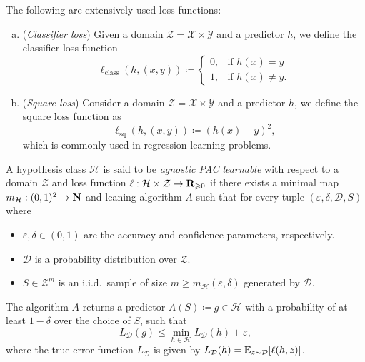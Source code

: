 \begin{example}
    \label{exp:loss-functions}
    The following are extensively used loss functions:
    \begin{enumerate}[(a)]\setlength\itemsep{0em}
        \item (\emph{Classifier loss}) Given a domain \(\mathcal{Z} = \mathcal{X} \times
              \mathcal{Y}\) and a predictor \(h\), we define the classifier loss function
              \[
                  \ell_{\text{class}}(h, (x, y)) \coloneq
                  \begin{cases}
                      0, & \text{if } h(x) = y     \\
                      1, & \text{if } h(x) \neq y.
                  \end{cases}
              \]

        \item (\emph{Square loss}) Consider a domain \(\mathcal{Z} = \mathcal{X} \times
              \mathcal{Y}\) and a predictor \(h\), we define the square loss function as
              \[
                  \ell_{\text{sq}}(h, (x, y)) \coloneq (h(x) - y)^2,
              \]
              which is commonly used in regression learning problems.
    \end{enumerate}
\end{example}

\begin{definition}
    \label{def:agnostic-pac-learning-model-loss-function}
    A hypothesis class \(\mathcal{H}\) is said to be \emph{agnostic PAC learnable}
    with respect to a domain \(\mathcal{Z}\) and loss function
    \(\ell: \mathcal{H} \times \mathcal{Z} \to \mathbf{R}_{\geqslant 0}\) if there exists a
    minimal map \(m_{\mathcal{H}}: (0, 1)^2 \to \mathbf{N}\) and leaning algorithm \(A\)
    such that for every tuple \((\varepsilon, \delta, \mathcal{D}, S)\) where
    \begin{itemize}\setlength\itemsep{0em}
        \item \(\varepsilon, \delta \in (0, 1)\) are the accuracy and confidence
              parameters, respectively.
        \item \(\mathcal{D}\) is a probability distribution over
              \(\mathcal{Z}\).
        \item \(S \in \mathcal{Z}^m\) is an i.i.d.~sample of size
              \(m \geq m_{\mathcal{H}}(\varepsilon, \delta)\) generated by \(\mathcal{D}\).
    \end{itemize}
    The algorithm \(A\) returns a predictor \(A(S) \coloneq g \in \mathcal{H}\) with
    a probability of at least \(1 - \delta\) over the choice of \(S\), such that
    \[
        L_{\mathcal{D}}(g) \leq \min_{h \in \mathcal{H}} L_{\mathcal{D}}(h) + \varepsilon,
    \]
    where the true error function \(L_{\mathcal{D}}\) is given by
    \(L_{\mathcal{D}}(h) = \operatorname{\mathbb{E}}_{z \sim \mathcal{D}}[\ell(h, z)]\).
\end{definition}

